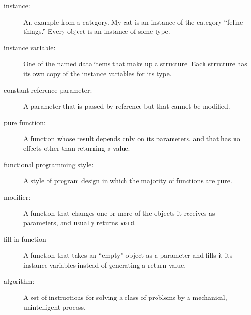 \begin{description}

\item[instance:]  An example from a category.  My cat is an
instance of the category ``feline things.''  Every object is
an instance of some type.

\item[instance variable:]  One of the named data items that make
up a structure.  Each structure has its own copy of
the instance variables for its type.

\item[constant reference parameter:]  A parameter that is passed
by reference but that cannot be modified.

\item[pure function:]  A function whose result depends only on its
parameters, and that has no effects other than returning
a value.

\item[functional programming style:]  A style of program design
in which the majority of functions are pure.

\item[modifier:]  A function that changes one or more of the objects
it receives as parameters, and usually returns {\tt void}.

\item[fill-in function:]  A function that takes an ``empty''
object as a parameter and fills it its instance variables instead
of generating a return value.

\item[algorithm:]  A set of instructions for solving a class of
problems by a mechanical, unintelligent process.


\end{description}
